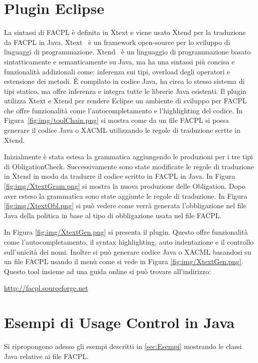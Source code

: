 \section{Plugin Eclipse}
\label{sec:Plugin Eclipse}
La sintassi di \ac{FACPL} è definita in Xtext e viene usato Xtend per la traduzione da \ac{FACPL} in Java.
Xtext~\cite{xtext} è un framework open-source per lo sviluppo di linguaggi di programmazione.
Xtend~\cite{xtend} è un linguaggio di programmazione basato sintatticamente e semanticamente su Java, ma
ha una sintassi più concisa e funzionalità addizionali come: inferenza sui tipi, overload degli operatori e estensione dei metodi.
\MakeUppercase{è} compilato in codice Java, ha circa lo stesso sistema di tipi statico, ma offre inferenza e integra tutte le librerie Java esistenti.
Il plugin utilizza Xtext e Xtend per rendere Eclipse un ambiente di sviluppo per \ac{FACPL} che offre funzionalità
come l'autocompletamento e l'highlighting del codice. In Figura~\ref{fig:img/toolChain.png} si mostra come da un file \ac{FACPL}
si possa generare il codice Java o \ac{XACML} utilizzando le regole di traduzione scrtte in Xtend.\par
{}
Inizialmente è stata estesa la grammatica aggiungendo le produzioni per i tre tipi di ObligationCheck.
Successivamente sono state modificate le regole di traduzione in Xtend in modo da tradurre il codice scritto in \ac{FACPL} in Java.
In Figura \ref{fig:img/XtextGram.png} si mostra la nuova produzione delle Obligation.
Dopo aver esteso la grammatica sono state aggiunte le regole di traduzione. In Figura \ref{fig:img/XtextObl.png} si può
vedere come verrà generata l'obbligazione nel file Java della politica in base al
tipo di obbligazione usata nel file \ac{FACPL}.\par
In Figura \ref{fig:img/XtextGen.png} si presenta il plugin. Questo offre funzionalità come l'autocompletamento, il
syntax highlighting, auto indentazione e il controllo sull'unicità dei nomi.
Inoltre si può generare codice Java o XACML basandosi su un file \ac{FACPL} usando il menù come si
vede in Figura \ref{fig:img/XtextGen.png}. Questo tool insieme ad una guida online si può trovare all'indirizzo:
\begin{center}
  \url{http://facpl.sourceforge.net}
\end{center}
\section{Esempi di Usage Control in Java}
\label{sec:Esempi in Java}
Si ripropongono adesso gli esempi descritti in \ref{sec:Esempi} mostrando le classi Java relative
ai file \ac{FACPL}.
